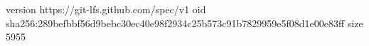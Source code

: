version https://git-lfs.github.com/spec/v1
oid sha256:289befbbf56d9bebc30ec40e98f2934c25b573c91b7829959e5f08d1e00e83ff
size 5955
